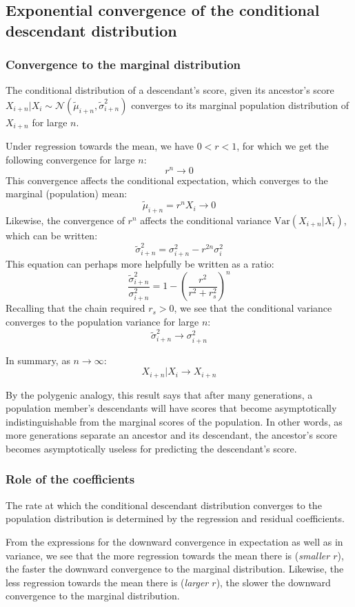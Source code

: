 \documentclass[letterpaper,10pt]{article} %
\begin{document}
\subsection{Exponential convergence of the conditional descendant distribution}

\subsubsection*{Convergence to the marginal distribution}
The conditional distribution of a descendant's score, given its ancestor's score $X_{i+n}|X_i \sim \mathcal{N}( \tilde{\mu}_{i+n}, \tilde{\sigma}_{i+n}^2)$ converges to its marginal population distribution of $X_{i+n}$ for large $n$.

Under regression towards the mean, we have $0 < r < 1$, for which we get the following convergence for large $n$:
$$r^n \rightarrow 0$$
This convergence affects the conditional expectation, which converges to the marginal (population) mean:
$$\tilde{\mu}_{i+n} = r^nX_i \rightarrow 0$$
Likewise, the convergence of $r^n$ affects the conditional variance $\mathrm{Var}(X_{i+n}|X_i)$, which can be written:
$$\tilde{\sigma}_{i+n}^2 = \sigma_{i+n}^2 - r^{2n} \sigma_i^2$$
This equation can perhaps more helpfully be written as a ratio:
$$\frac{\tilde{\sigma}_{i+n}^2}{\sigma_{i+n}^2} = 1 - (\frac{r^2}{r^2+r_s^2})^n$$
Recalling that the chain required $r_s > 0$, we see that the conditional variance converges to the population variance for large $n$:
$$\tilde{\sigma}_{i+n}^2 \rightarrow \sigma_{i+n}^2$$

In summary, as $n \rightarrow \infty$:
$$X_{i+n}|X_i \rightarrow X_{i+n}$$

By the polygenic analogy, this result says that after many generations, a population member's descendants will have scores that become asymptotically indistinguishable from the marginal scores of the population. In other words, as more generations separate an ancestor and its descendant, the ancestor's score becomes asymptotically useless for predicting the descendant's score.


\subsubsection*{Role of the coefficients}
The rate at which the conditional descendant distribution converges to the population distribution is determined by the regression and residual coefficients. 

From the expressions for the downward convergence in expectation as well as in variance, we see that the more regression towards the mean there is (\emph{smaller $r$}), the faster the downward convergence to the marginal distribution. Likewise, the less regression towards the mean there is (\emph{larger $r$}), the slower the downward convergence to the marginal distribution. 
\end{document}
